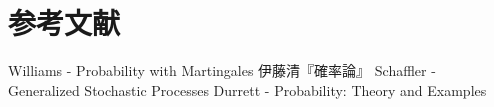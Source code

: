\documentclass[uplatex,dvipdfmx]{jsreport}
\begin{document}
\chapter{参考文献}

\begin{thebibliography}{99}
    Williams - Probability with Martingales
    伊藤清『確率論』
    Schaffler - Generalized Stochastic Processes
    Durrett - Probability: Theory and Examples
\end{thebibliography}
\end{document}
